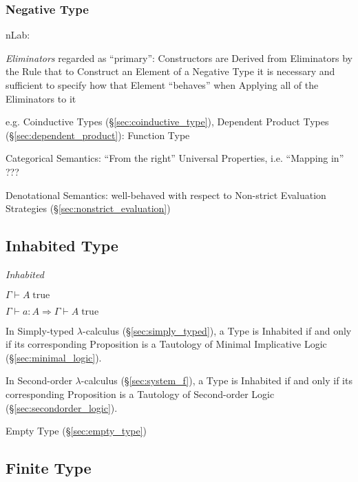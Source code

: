 \subsubsection{Negative Type}\label{sec:negative_type}

nLab:

\emph{Eliminators} regarded as ``primary'': Constructors are Derived
from Eliminators by the Rule that to Construct an Element of a
Negative Type it is necessary and sufficient to specify how that
Element ``behaves'' when Applying all of the Eliminators to it

e.g. Coinductive Types (\S\ref{sec:coinductive_type}), Dependent
Product Types (\S\ref{sec:dependent_product}): Function Type

Categorical Semantics: ``From the right'' Universal Properties, i.e.
``Mapping in'' ???

Denotational Semantics: well-behaved with respect to Non-strict
Evaluation Strategies (\S\ref{sec:nonstrict_evaluation})



\subsection{Inhabited Type}\label{sec:inhabited_type}

\emph{Inhabited}

$\Gamma \vdash A\;\mathrm{true}$

$\Gamma \vdash a:A \Rightarrow \Gamma \vdash A\;\mathrm{true}$

In Simply-typed $\lambda$-calculus (\S\ref{sec:simply_typed}), a Type
is Inhabited if and only if its corresponding Proposition is a
Tautology of Minimal Implicative Logic (\S\ref{sec:minimal_logic}).

In Second-order $\lambda$-calculus (\S\ref{sec:system_f}), a
Type is Inhabited if and only if its corresponding Proposition is a
Tautology of Second-order Logic (\S\ref{sec:secondorder_logic}).

Empty Type (\S\ref{sec:empty_type})



\subsection{Finite Type}\label{sec:finite_type}

